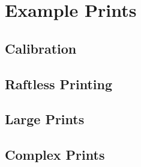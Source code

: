 \chapter{Example Prints}
	
	\label{sec:examplePrints}
	
	\section{Calibration}
	
	\section{Raftless Printing}
	
	\section{Large Prints}
	
	\section{Complex Prints}

